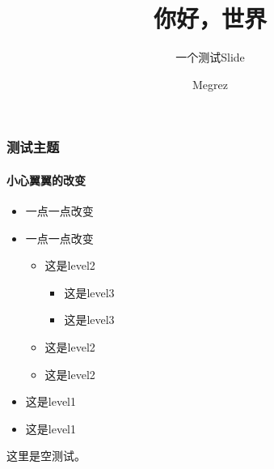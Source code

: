 \documentclass[t,12pt]{beamer}
\title{你好，世界}
\subtitle{\longdash 一个测试Slide}
\author[del2z]{Megrez}
\institute{\href{mailto:delta.z@aliyun.com}{delta.z@aliyun.com}}
\begin{document}
\begin{frame}
\titlepage
\end{frame}

\begin{frame}
\frametitle{测试主题}
\framesubtitle{小心翼翼的改变}
\begin{itemize}
  \item 一点一点改变
  \item 一点一点改变
  \begin{itemize}
    \item 这是level2
    \begin{itemize}
       \item 这是level3
       \item 这是level3
    \end{itemize}
    \item 这是level2
    \item 这是level2
  \end{itemize}
  \item 这是level1
  \item 这是level1
\end{itemize}
\end{frame}

\begin{frame}
这里是空测试。
\end{frame}

\begin{frame}
\lastpage
\end{frame}
\end{document}
